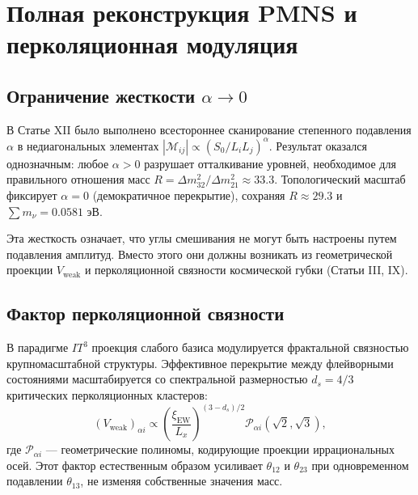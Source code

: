 \documentclass[12pt,a4paper]{article}
\begin{document}
\section{Полная реконструкция PMNS и перколяционная модуляция}
\subsection{Ограничение жесткости $\alpha \to 0$}
В Статье XII было выполнено всестороннее сканирование степенного подавления $\alpha$ в недиагональных элементах $|\mathcal{M}_{ij}| \propto (S_0/L_i L_j)^\alpha$. Результат оказался однозначным: любое $\alpha > 0$ разрушает отталкивание уровней, необходимое для правильного отношения масс $R = \Delta m^2_{32}/\Delta m^2_{21} \approx 33.3$. Топологический масштаб фиксирует $\alpha = 0$ (демократичное перекрытие), сохраняя $R \approx 29.3$ и $\sum m_\nu = 0.0581$ эВ.

Эта жесткость означает, что углы смешивания не могут быть настроены путем подавления амплитуд. Вместо этого они должны возникать из геометрической проекции $V_{\text{weak}}$ и перколяционной связности космической губки (Статьи III, IX).

\subsection{Фактор перколяционной связности}
В парадигме $IT^3$ проекция слабого базиса модулируется фрактальной связностью крупномасштабной структуры. Эффективное перекрытие между флейворными состояниями масштабируется со спектральной размерностью $d_s = 4/3$ критических перколяционных кластеров:
\begin{equation}
    (V_{\text{weak}})_{\alpha i} \propto \left( \frac{\xi_{\text{EW}}}{L_x} \right)^{(3-d_s)/2} \mathcal{P}_{\alpha i}(\sqrt{2}, \sqrt{3}),
\end{equation}
где $\mathcal{P}_{\alpha i}$ — геометрические полиномы, кодирующие проекции иррациональных осей. Этот фактор естественным образом усиливает $\theta_{12}$ и $\theta_{23}$ при одновременном подавлении $\theta_{13}$, не изменяя собственные значения масс.
\end{document}
